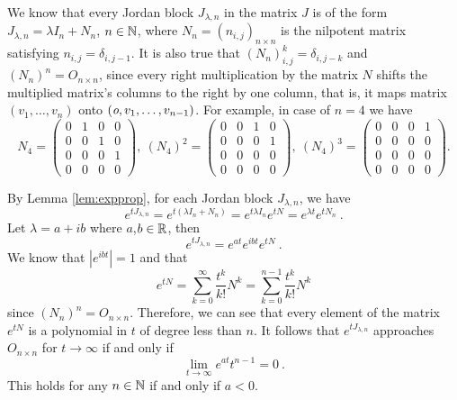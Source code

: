 We know that every Jordan block $J_{\lambda,n}$ in the matrix $J$ is of the form \linebreak $J_{\lambda,n}=\lambda I_n+N_n$, $n \in\mathbb{N}$, where $N_n=\left(n_{i,j}\right)_{n\times n}$ is the nilpotent matrix satisfying $n_{i,j}=\delta_{i,j-1}$. 
It is also true that $(N_n)^k_{i,j}=\delta_{i,j-k}$ and $(N_n)^n=O_{n \times n}$, since every right multiplication by the matrix $N$ shifts the multiplied matrix's columns to the right by one column, that is, it maps matrix $(v_1,\ldots,v_n)$ onto $(\textit{o},v_1,\ldots,v_{n-1})$. For example, in case of $n=4$ we have
\begin{equation*}
	N_4=
	\begin{pmatrix}
		0 & 1 & 0 & 0 \\
		0 & 0 & 1 & 0 \\
		0 & 0 & 0 & 1 \\
		0 & 0 & 0 & 0 
	\end{pmatrix},\ 
	(N_4)^2=
	\begin{pmatrix}
		0 & 0 & 1 & 0 \\
		0 & 0 & 0 & 1 \\
		0 & 0 & 0 & 0 \\
		0 & 0 & 0 & 0 
	\end{pmatrix},\ 
	(N_4)^3=
	\begin{pmatrix}
		0 & 0 & 0 & 1 \\
		0 & 0 & 0 & 0 \\
		0 & 0 & 0 & 0 \\
		0 & 0 & 0 & 0 
	\end{pmatrix}
	.
\end{equation*}

By Lemma \ref{lem:expprop}, for each Jordan block $J_{\lambda,n}$, we have
$$e^{tJ_{\lambda,n}}=e^{t(\lambda I_n + N_n)}=e^{t\lambda I_n}e^{tN}=e^{\lambda t}e^{tN_n}\ .$$
Let $\lambda = a+ib$ where $a$,$b \in \mathbb{R}$, then
$$e^{tJ_{\lambda,n}}=e^{at}e^{ibt}e^{tN}\ .$$
We know that $|e^{ibt}|=1$ and that
$$e^{tN}=\sum^\infty_{k=0}\frac{t^k}{k!}N^k=\sum^{n-1}_{k=0}\frac{t^k}{k!}N^k$$
since $(N_n)^n=O_{n \times n}$. Therefore, we can see that every element of the matrix $e^{tN}$ is a polynomial in $t$ of degree less than $n$. It follows that $e^{tJ_{\lambda,n}}$ approaches $O_{n \times n}$ for $t\rightarrow\infty$ if and only if
$$\lim_{t\to\infty}e^{at}t^{n-1}=0\ .$$
This holds for any $n\in\mathbb{N}$ if and only if $a<0$. 

